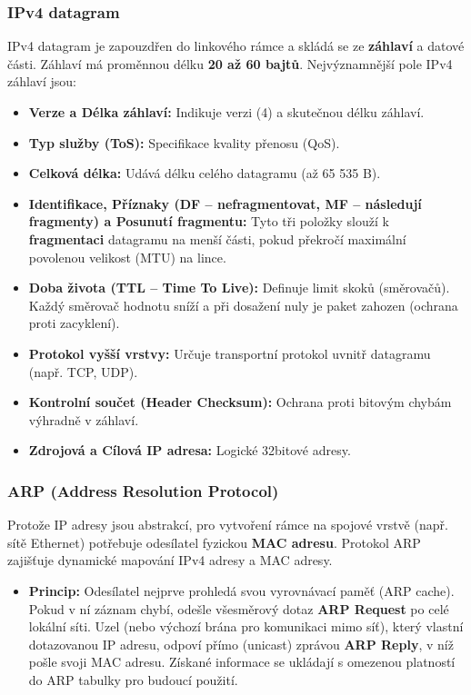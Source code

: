         \subsubsection{IPv4 datagram}
            IPv4 datagram je zapouzdřen do linkového rámce a skládá se ze \textbf{záhlaví} a datové části. Záhlaví má proměnnou délku \textbf{20 až 60 bajtů}. Nejvýznamnější pole IPv4 záhlaví jsou:
            \begin{itemize}
                \item \textbf{Verze a Délka záhlaví:} Indikuje verzi (4) a skutečnou délku záhlaví.
                \item \textbf{Typ služby (ToS):} Specifikace kvality přenosu (QoS).
                \item \textbf{Celková délka:} Udává délku celého datagramu (až 65 535 B).
                \item \textbf{Identifikace, Příznaky (DF -- nefragmentovat, MF -- následují fragmenty) a Posunutí fragmentu:} Tyto tři položky slouží k \textbf{fragmentaci} datagramu na menší části, pokud překročí maximální povolenou velikost (MTU) na lince.
                \item \textbf{Doba života (TTL -- Time To Live):} Definuje limit skoků (směrovačů). Každý směrovač hodnotu sníží a při dosažení nuly je paket zahozen (ochrana proti zacyklení).
                \item \textbf{Protokol vyšší vrstvy:} Určuje transportní protokol uvnitř datagramu (např. TCP, UDP).
                \item \textbf{Kontrolní součet (Header Checksum):} Ochrana proti bitovým chybám výhradně v záhlaví.
                \item \textbf{Zdrojová a Cílová IP adresa:} Logické 32bitové adresy.
            \end{itemize}
        \subsubsection{ARP (Address Resolution Protocol)}
            Protože IP adresy jsou abstrakcí, pro vytvoření rámce na spojové vrstvě (např. sítě Ethernet) potřebuje odesílatel fyzickou \textbf{MAC adresu}. Protokol ARP zajišťuje dynamické mapování IPv4 adresy a MAC adresy.
            \begin{itemize}
                \item \textbf{Princip:} Odesílatel nejprve prohledá svou vyrovnávací paměť (ARP cache). Pokud v ní záznam chybí, odešle všesměrový dotaz \textbf{ARP Request} po celé lokální síti. Uzel (nebo výchozí brána pro komunikaci mimo síť), který vlastní dotazovanou IP adresu, odpoví přímo (unicast) zprávou \textbf{ARP Reply}, v níž pošle svoji MAC adresu. Získané informace se ukládají s omezenou platností do ARP tabulky pro budoucí použití.
            \end{itemize}
